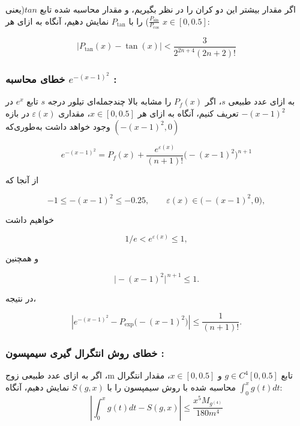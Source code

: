 \documentclass[12pt,a4paper]{article}
\begin{document}
 \newpage
 اگر مقدار بیشتر این دو کران را در نظر بگیریم، و مقدار محاسبه شده تابع $tan$(یعنی $\frac{P_{\sin}}{P_{\cos}}$) را با $P_{\tan}$ نمایش دهیم، آنگاه به ازای هر $x \in [0,0.5]$:
 
 \begin{equation}
     |P_{\tan}(x) - \tan(x)| < \frac{3}{2^{2n+4}(2n+2)!}
     \label{tan_error}
 \end{equation}

 \subsubsection{خطای محاسبه $e^{-(x-1)^2}$ :}
 
به ازای عدد طبیعی $s$، اگر $P_{f}(x)$ را مشابه بالا چندجمله‌ای تیلور درجه $s$ تابع $e^x$ در $-(x-1)^2$ تعریف کنیم، آنگاه به ازای هر $x \in [0,0.5]$، مقداری
\(\varepsilon(x)\) در بازه \((-(x-1)^2,0)\) وجود خواهد داشت به‌طوری‌که

\begin{equation*}
    e^{-(x-1)^2} = P_{f}(x) + \frac{e^{\varepsilon(x)}}{(n+1)!}
    \bigl(-(x-1)^2\bigr)^{n+1}
\end{equation*}

از آنجا که

\begin{equation*}
    -1 \le -(x-1)^2 \le -0.25,\qquad
    \varepsilon(x)\in\bigl(-(x-1)^2,0\bigr),
\end{equation*}

خواهیم داشت

\begin{equation*}
1/e < e^{\varepsilon(x)} \le 1,
\end{equation*}

و همچنین

\begin{equation*}
\bigl|-(x-1)^2\bigr|^{\,n+1}\le1.
\end{equation*}

در نتیجه،

\begin{equation}
\left|
e^{-(x-1)^2}
-
P_{\exp}\bigl(-(x-1)^2\bigr)
\right|
\le
\frac{1}{(n+1)!}.
\label{f_error}
\end{equation}

\subsubsection{خطای روش انتگرال گیری سیمپسون :}
اگر به ازای عدد طبیعی زوج ،m تابع $g \in C^4[0, 0.5]$ و $x \in [0,0.5]$، مقدار انتگرال $\int_0^xg(t)dt$ محاسبه شده با روش سیمپسون را با $S(g,x)$ نمایش دهیم، آنگاه: 
\begin{equation}
    |\int_0^xg(t)dt - S(g,x)| \le \frac{x^5 M_{g^{(4)}}}{180m^4}
    \label{simson_error}
\end{equation}
\end{document}

